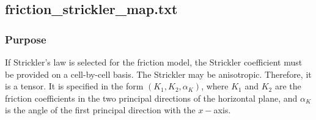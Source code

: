 \hypertarget{StricklerFileFormat}{}
\subsection{friction\_strickler\_map.txt}
\subsubsection{Purpose}
If Strickler's law is selected for the friction model, the Strickler coefficient must be provided on a cell-by-cell basis. The Strickler may be anisotropic. Therefore, it is a tensor. It is specified in the form $(K_1 , K_2, \alpha_K)$, where $K_1$ and $K_2$ are the friction coefficients in the two principal directions of the horizontal plane, and $\alpha_K$ is the angle of the first principal direction with the $x-$axis.
%
